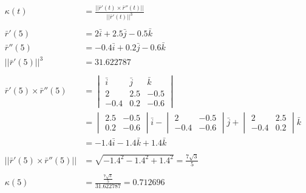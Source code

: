 \documentclass[a4paper,11pt]{article}
\begin{document}
\begin{enumerate}
\begin{enumerate}
        \begin{align*}
            \kappa(t) &= \frac{|| \bar{r}'(t) \times \bar{r}''(t) ||}{|| \bar{r}'(t) ||^3}\\\\
            \bar{r}'(5) &= 2\bar{i} + 2.5\bar{j} - 0.5\bar{k}\\
            \bar{r}''(5) &= -0.4\bar{i} + 0.2\bar{j} - 0.6\bar{k}\\
            || \bar{r}'(5) ||^3 &= 31.622787\\\\
            \bar{r}'(5) \times \bar{r}''(5) &=  
            \begin{vmatrix}
                \bar{i} & \bar{j} & \bar{k}\\
                2 & 2.5 & -0.5 \\
                -0.4 & 0.2 & -0.6
            \end{vmatrix}\\
            &= \begin{vmatrix}
                2.5 & -0.5 \\
                0.2 & -0.6
            \end{vmatrix} \bar{i}
            -\begin{vmatrix}
                2 & -0.5\\
                -0.4 & -0.6
            \end{vmatrix} \bar{j}
            +  \begin{vmatrix}
                2 & 2.5\\
                -0.4 & 0.2
            \end{vmatrix}\bar{k}\\
            &= -1.4\bar{i} -1.4\bar{k} + 1.4\bar{k}\\\\
            || \bar{r}'(5) \times \bar{r}''(5) || &= \sqrt{-1.4^2 -1.4^2 + 1.4^2} = \frac{7\sqrt{3}}{5}\\\\
            \kappa(5) &= \frac{\frac{7\sqrt{3}}{5}}{31.622787} = 0.712696
        \end{align*}

    \end{enumerate}


\end{enumerate}
\end{document}
